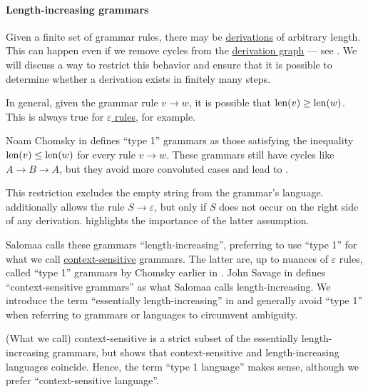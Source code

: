 \paragraph{Length-increasing grammars}

\begin{remark}\label{rem:length_increasing_grammar}
  Given a finite set of grammar rules, there may be \hyperref[def:formal_grammar/derivation]{derivations} of arbitrary length. This can happen even if we remove cycles from the \hyperref[def:formal_grammar/graph]{derivation graph} --- see . We will discuss a way to restrict this behavior and ensure that it is possible to determine whether a derivation exists in finitely many steps.

  In general, given the grammar rule \( v \to w \), it is possible that \( \operatorname{len}(v) \geq \operatorname{len}(w) \). This is always true for \hyperref[def:epsilon_free_grammar]{\( \varepsilon \) rules}, for example.

  Noam Chomsky in \cite[361]{MathPsychology1963Vol2} defines \enquote{type 1} grammars as those satisfying the inequality \( \operatorname{len}(v) \leq \operatorname{len}(w) \) for every rule \( v \to w \). These grammars still have cycles like \( A \to B \to A \), but they avoid more convoluted cases and lead to .

  This restriction excludes the empty string from the grammar's language.  additionally allows the rule \( S \to \varepsilon \), but only if \( S \) does not occur on the right side of any derivation.  highlights the importance of the latter assumption.

  Salomaa calls these grammars \enquote{length-increasing}, preferring to use \enquote{type 1} for what we call \hyperref[def:chomsky_hierarchy/context_sensitive]{context-sensitive} grammars. The latter are, up to nuances of \( \varepsilon \) rules, called \enquote{type 1} grammars by Chomsky earlier in \cite[142]{Chomsky1959}. John Savage in \cite[def. 4.9.2]{Savage1998} defines \enquote{context-sensitive grammars} as what Salomaa calls length-increasing. We introduce the term \enquote{essentially length-increasing} in  and generally avoid \enquote{type 1} when referring to grammars or languages to circumvent ambiguity.

  (What we call) context-sensitive  is a strict subset of the essentially length-increasing grammars, but  shows that context-sensitive  and length-increasing languages coincide. Hence, the term \enquote{type 1 language} makes sense, although we prefer \enquote{context-sensitive language}.
\end{remark}

